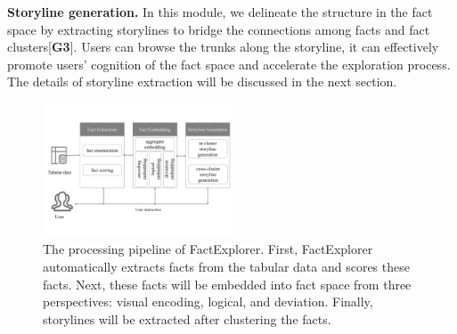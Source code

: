 \textbf{Storyline generation. }In this module, we delineate the structure in the fact space by extracting storylines to bridge the connections among facts and fact clusters[\textbf{G3}]. Users can browse the trunks along the storyline, it can effectively promote users' cognition of the fact space and accelerate the exploration process. The details of storyline extraction will be discussed in the next section.
\begin{figure}[h]
	\centering
	\includegraphics[width=0.5\textwidth]{figures/pipline.pdf}
	\caption{The processing pipeline of FactExplorer. First, FactExplorer automatically extracts facts from the tabular data and scores these facts. Next, these facts will be embedded into fact space from three perspectives: visual encoding, logical, and deviation. Finally, storylines will be extracted after clustering the facts.}
	\label{pipline}
\end{figure}
